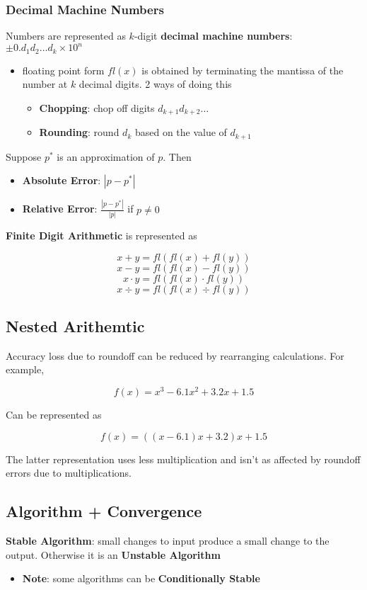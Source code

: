 \documentclass{article}
\begin{document}
  \subsubsection{Decimal Machine Numbers}
  Numbers are represented as $k$-digit \textbf{decimal machine numbers}: $\pm 0. d_1d_2\ldots d_k \times 10^n$
  \begin{itemize}
    \item floating point form $fl(x)$ is obtained by terminating the mantissa of the number at $k$ decimal digits. 2 ways of doing this
      \begin{itemize}
        \item \textbf{Chopping}: chop off digits $d_{k+1}d_{k+2} \ldots$
        \item \textbf{Rounding}: round $d_k$ based on the value of $d_{k+1}$
      \end{itemize}
  \end{itemize}
  Suppose $p^*$ is an approximation of $p$. Then
  \begin{itemize}
  \item \textbf{Absolute Error}: $|p - p^*|$
  \item \textbf{Relative Error}: $\frac{|p - p^*|}{|p|}$ if $p \neq 0$
  \end{itemize}

  \textbf{Finite Digit Arithmetic} is represented as

  \[x + y = fl(fl(x) + fl(y))\]
  \[x - y = fl(fl(x) - fl(y))\]
  \[x \cdot y = fl(fl(x) \cdot fl(y))\]
  \[x \div y = fl(fl(x) \div fl(y))\]

  \subsection{Nested Arithemtic}
  Accuracy loss due to roundoff can be reduced by rearranging calculations. For example, 

  \[f(x) = x^3 - 6.1x^2 + 3.2x + 1.5\]

  Can be represented as

  \[f(x) = ((x-6.1)x + 3.2)x + 1.5\]

  The latter representation uses less multiplication and isn't as affected by roundoff errors due to multiplications. 

  \subsection{Algorithm + Convergence}
  \textbf{Stable Algorithm}: small changes to input produce a small change to the output. Otherwise it is an \textbf{Unstable Algorithm}
  \begin{itemize}
    \item \textbf{Note}: some algorithms can be \textbf{Conditionally Stable}
  \end{itemize}
\end{document}
